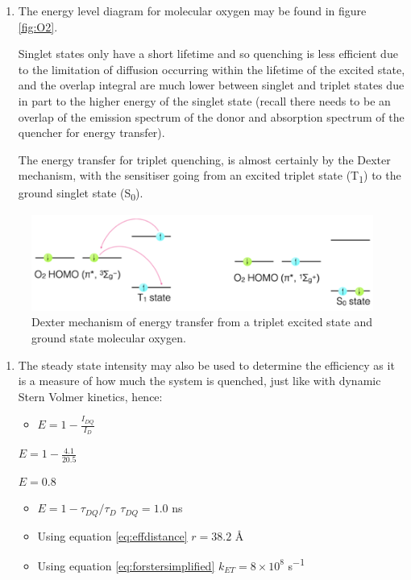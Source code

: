 \documentclass[
]{book}
\providecommand{\tightlist}{%
  \setlength{\itemsep}{0pt}\setlength{\parskip}{0pt}}
\begin{document}
\begin{enumerate}
\def\labelenumi{\arabic{enumi}.}
\setcounter{enumi}{1}
\item
  The energy level diagram for molecular oxygen may be found in figure \ref{fig:O2}.

  Singlet states only have a short lifetime and so quenching is less efficient due to the limitation of diffusion occurring within the lifetime of the excited state, and the overlap integral are much lower between singlet and triplet states due in part to the higher energy of the singlet state (recall there needs to be an overlap of the emission spectrum of the donor and absorption spectrum of the quencher for energy transfer).

  The energy transfer for triplet quenching, is almost certainly by the Dexter mechanism, with the sensitiser going from an excited triplet state (T\textsubscript{1}) to the ground singlet state (S\textsubscript{0}).
\end{enumerate}

\begin{figure}

{\centering \includegraphics[width=0.7\linewidth]{images/O2quench} 

}

\caption{Dexter mechanism of energy transfer from a triplet excited state and ground state molecular oxygen.}\label{fig:O2quench}
\end{figure}

\begin{enumerate}
\def\labelenumi{\arabic{enumi}.}
\setcounter{enumi}{2}
\item
  The steady state intensity may also be used to determine the efficiency as it is a measure of how much the system is quenched, just like with dynamic Stern Volmer kinetics, hence:

  \begin{itemize}
  \tightlist
  \item
    \(E = 1 − \frac{I_{DQ}}{I_D}\)
  \end{itemize}

  \(E = 1 − \frac{4.1}{20.5}\)

  \(E = 0.8\)

  \begin{itemize}
  \item
    \(E = 1 − \tau_{DQ} / \tau_D\)
    \(\tau_{DQ} = 1.0\) ns
  \item
    Using equation \eqref{eq:effdistance} \(r = 38.2\) Å
  \item
    Using equation \eqref{eq:forstersimplified} \(k_{ET} = 8 × 10^8\) s\textsuperscript{−1}
  \end{itemize}
\end{enumerate}
\end{document}
